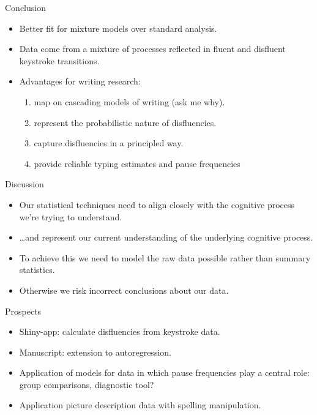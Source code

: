 \begin{frame}{Conclusion}
	\begin{itemize}
		\item Better fit for mixture models over standard analysis.
		\item Data come from a mixture of processes reflected in fluent and disfluent keystroke transitions.
		\item Advantages for writing research:
		\begin{enumerate}
			\item map on cascading models of writing (ask me why).
			\item represent the probabilistic nature of disfluencies.
			\item capture disfluencies in a principled way.
			\item provide reliable typing estimates and pause frequencies
		\end{enumerate}
	\end{itemize}
\end{frame}

\begin{frame}{Discussion}
	\begin{itemize}
		\item Our statistical techniques need to align closely with the cognitive process we're trying to understand.
		\item \dots and represent our current understanding of the underlying cognitive process.
		\item To achieve this we need to model the raw data possible rather than summary statistics.
		\item Otherwise we risk incorrect conclusions about our data.
	\end{itemize}	
\end{frame}

\begin{frame}{Prospects}	
	\begin{itemize}
		\item Shiny-app: calculate disfluencies from keystroke data.
		\item Manuscript: extension to autoregression.
		\item Application of models for data in which pause frequencies play a central role: group comparisons, diagnostic tool?
		\item Application picture description data with spelling manipulation.
	\end{itemize}
\end{frame}
